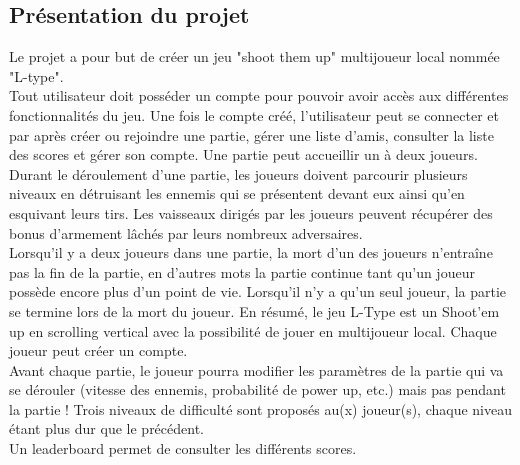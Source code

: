 \documentclass[french]{article}
\begin{document}
\subsection{Présentation du projet}
Le projet a pour but de créer un jeu "shoot them up" multijoueur local nommée "L-type".
\newline
\\Tout utilisateur doit posséder un compte pour pouvoir avoir accès aux différentes fonctionnalités du jeu. Une fois le compte créé, l’utilisateur peut se connecter et par après créer ou rejoindre une partie, gérer une liste d’amis, consulter la liste des scores et gérer son compte.
Une partie peut accueillir un à deux joueurs.
Durant le déroulement d’une partie, les joueurs doivent parcourir plusieurs niveaux en détruisant les ennemis qui se présentent devant eux ainsi qu'en esquivant leurs tirs. Les vaisseaux dirigés par les joueurs peuvent récupérer des bonus d’armement lâchés par leurs nombreux adversaires.
\newline
\\Lorsqu’il y a deux joueurs dans une partie, la mort d’un des joueurs n’entraîne pas la fin de la partie, en d’autres mots la partie continue tant qu’un joueur possède encore plus d'un point de vie. Lorsqu’il n’y a qu’un seul joueur, la partie se termine lors de la mort du joueur.
En résumé, le jeu L-Type est un Shoot'em up en scrolling vertical avec la possibilité de jouer en multijoueur local. Chaque joueur peut créer un compte.
\newline
\\Avant chaque partie, le joueur pourra modifier les paramètres de la partie qui va se dérouler (vitesse des ennemis, probabilité de power up,  etc.) mais pas pendant la partie ! Trois niveaux de difficulté sont proposés au(x) joueur(s), chaque niveau étant plus dur que le précédent.
\newline
\\ Un leaderboard permet de consulter les différents scores.
\end{document}
